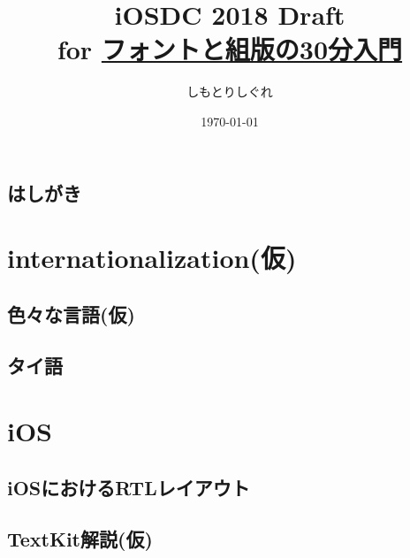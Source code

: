 \documentclass[10pt,twoside,openright,dvipdfmx]{jsbook}
\title{%
    iOSDC 2018 Draft \\
    \large for \href{https://fortee.jp/iosdc-japan-2018/proposal/8e9e8e22-8ff1-4381-813a-347475c2606f}{フォントと組版の30分入門}}
\author[$\dagger$]{しもとりしぐれ}
\affil[$\dagger$]{@S\_Shimotori}
\date{\today}
\newcommand\blankpage{%
    \null
    \thispagestyle{empty}
    \addtocounter{page}{-1}
    \newpage
}
\begin{document}
\maketitle
\restoregeometry

\afterpage{\blankpage}


\tableofcontents
\thispagestyle{plain}

\chapter*{はしがき}
\thispagestyle{plain}


\cleardoublepage



\part{internationalization(仮)}\label{part:internationalization}
\restoregeometry

\chapter{色々な言語(仮)}\label{chapter:internationalization/languages}
\thispagestyle{plain}

\chapter{タイ語}\label{chapter:internationalization/languages/thai}


\part{iOS}\label{part:ios}
\restoregeometry

\chapter{iOSにおけるRTLレイアウト}\label{chapter:ios/rtl}
\thispagestyle{plain}


\chapter{TextKit解説(仮)}\label{chapter:ios/textKit}
\thispagestyle{plain}

\end{document}
